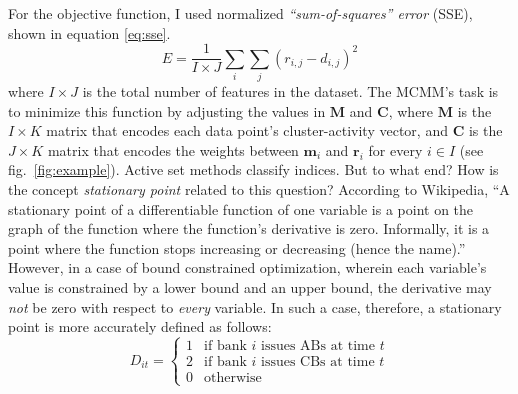 For the objective function, I used normalized \emph{``sum-of-squares'' error} (SSE), 
shown in equation \eqref{eq:sse}.
\begin{equation} \label{eq:sse}
E = \frac{1}{I \times J} \sum_{i} \sum_{j} {(r_{i,j} - d_{i,j})}^2
\end{equation}
 where $I \times J$ is the total number of features in the dataset.
The MCMM's task is to minimize this function by adjusting the
 values in $\mathbf{M}$ and $\mathbf{C}$, where
$\mathbf{M}$ is the $I \times K$ matrix that
encodes each data point's cluster-activity vector, 
and $\mathbf{C}$ is the $J \times K$ matrix that
encodes the weights between $\mathbf{m}_i$ and $\mathbf{r}_i$ for every $i \in I$ (see fig.~\ref{fig:example}). 
Active set methods classify indices. But to what end?
How is the concept \emph{stationary point} related to this question? 
 According to Wikipedia,
 ``A stationary point of a differentiable function of one variable is a 
 point on the graph of the function where the function's derivative is zero. 
 Informally, it is a point where the function stops increasing or decreasing 
 (hence the name).'' However, in a case of bound constrained optimization, 
 wherein each variable's value is constrained by a lower bound and an upper 
 bound, the derivative may \emph{not} be zero with respect to \emph{every} variable. 
 In such a case, therefore, a stationary point is more accurately defined as follows:
 \begin{equation}
  D_{it} =
    \begin{cases}
      1 & \text{if bank $i$ issues ABs at time $t$}\\
      2 & \text{if bank $i$ issues CBs at time $t$}\\
      0 & \text{otherwise}
    \end{cases}       
\end{equation}

